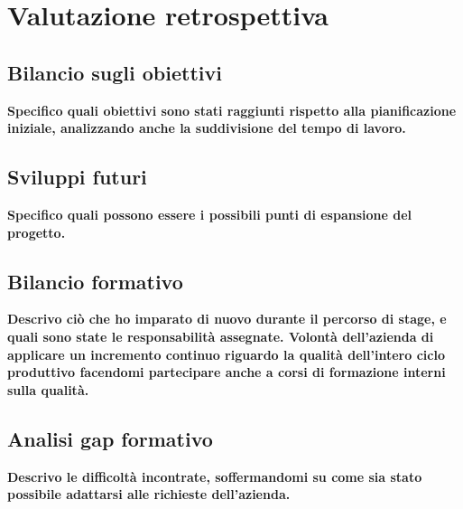 \chapter{Valutazione retrospettiva}

\section{Bilancio sugli obiettivi}
\textcolor{OliveGreen}{\textbf{Specifico quali obiettivi sono stati raggiunti rispetto alla pianificazione iniziale, analizzando anche la suddivisione del tempo di lavoro.}}

\section{Sviluppi futuri}
\textcolor{OliveGreen}{\textbf{Specifico quali possono essere i possibili punti di espansione del progetto.}}

\section{Bilancio formativo}
\textcolor{OliveGreen}{\textbf{Descrivo ciò che ho imparato di nuovo durante il percorso di stage, e quali sono state le responsabilità assegnate. Volontà dell'azienda di applicare un incremento continuo riguardo la qualità dell'intero ciclo produttivo facendomi partecipare anche a corsi di formazione interni sulla qualità.}}

\section{Analisi gap formativo}
\textcolor{OliveGreen}{\textbf{Descrivo le difficoltà incontrate, soffermandomi su come sia stato possibile adattarsi alle richieste dell'azienda.}}